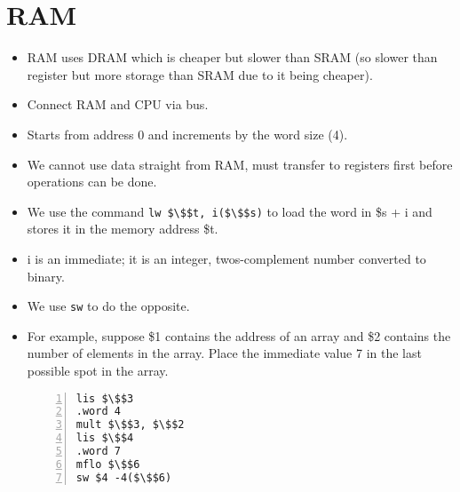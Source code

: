 \documentclass[12pt]{article}
\begin{document}
\section{RAM}
\begin{itemize}
    \item RAM uses DRAM which is cheaper but slower than SRAM (so slower than register but more storage than SRAM due to it being cheaper).
    \item Connect RAM and CPU via bus.
    \item Starts from address 0 and increments by the word size (4).
    \item We cannot use data straight from RAM, must transfer to registers first before operations can be done.
    \item We use the command \lstinline[mathescape]{lw $\$$t, i($\$$s)} to load the word in \$s + i and stores it in the memory address \$t.  
    \item i is an immediate; it is an integer, twos-complement number converted to binary.
    \item We use \lstinline[mathescape]{sw} to do the opposite.
    \item For example, suppose \$1 contains the address of an array and \$2 contains the number of elements in the array.  Place the immediate value 7 in  the last possible spot in the array.
        \begin{lstlisting}[mathescape, numbers=left, breaklines=true]
lis $\$$3
.word 4
mult $\$$3, $\$$2
lis $\$$4
.word 7
mflo $\$$6
sw $4 -4($\$$6) 
        \end{lstlisting} 
\end{itemize}
\end{document}
